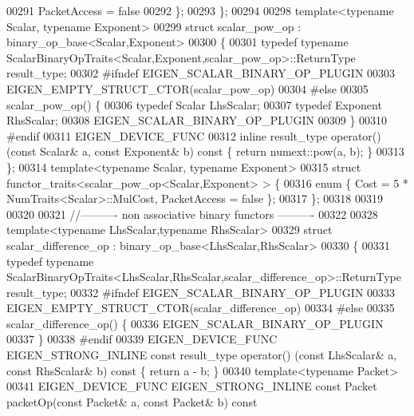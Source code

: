 \begin{DoxyCode}
00291     PacketAccess = \textcolor{keyword}{false}
00292   \};
00293 \};
00294 
00298 \textcolor{keyword}{template}<\textcolor{keyword}{typename} Scalar, \textcolor{keyword}{typename} Exponent>
00299 \textcolor{keyword}{struct }scalar\_pow\_op  : binary\_op\_base<Scalar,Exponent>
00300 \{
00301   \textcolor{keyword}{typedef} \textcolor{keyword}{typename} ScalarBinaryOpTraits<Scalar,Exponent,scalar\_pow\_op>::ReturnType result\_type;
00302 \textcolor{preprocessor}{#ifndef EIGEN\_SCALAR\_BINARY\_OP\_PLUGIN}
00303   EIGEN\_EMPTY\_STRUCT\_CTOR(scalar\_pow\_op)
00304 \textcolor{preprocessor}{#else}
00305   scalar\_pow\_op() \{
00306     \textcolor{keyword}{typedef} Scalar LhsScalar;
00307     \textcolor{keyword}{typedef} Exponent RhsScalar;
00308     EIGEN\_SCALAR\_BINARY\_OP\_PLUGIN
00309   \}
00310 \textcolor{preprocessor}{#endif}
00311   EIGEN\_DEVICE\_FUNC
00312   \textcolor{keyword}{inline} result\_type operator() (\textcolor{keyword}{const} Scalar& a, \textcolor{keyword}{const} Exponent& b)\textcolor{keyword}{ const }\{ \textcolor{keywordflow}{return} numext::pow(a, b); \}
00313 \};
00314 \textcolor{keyword}{template}<\textcolor{keyword}{typename} Scalar, \textcolor{keyword}{typename} Exponent>
00315 \textcolor{keyword}{struct }functor\_traits<scalar\_pow\_op<Scalar,Exponent> > \{
00316   \textcolor{keyword}{enum} \{ Cost = 5 * NumTraits<Scalar>::MulCost, PacketAccess = \textcolor{keyword}{false} \};
00317 \};
00318 
00319 
00320 
00321 \textcolor{comment}{//---------- non associative binary functors ----------}
00322 
00328 \textcolor{keyword}{template}<\textcolor{keyword}{typename} LhsScalar,\textcolor{keyword}{typename} RhsScalar>
00329 \textcolor{keyword}{struct }scalar\_difference\_op : binary\_op\_base<LhsScalar,RhsScalar>
00330 \{
00331   \textcolor{keyword}{typedef} \textcolor{keyword}{typename} ScalarBinaryOpTraits<LhsScalar,RhsScalar,scalar\_difference\_op>::ReturnType result\_type;
00332 \textcolor{preprocessor}{#ifndef EIGEN\_SCALAR\_BINARY\_OP\_PLUGIN}
00333   EIGEN\_EMPTY\_STRUCT\_CTOR(scalar\_difference\_op)
00334 \textcolor{preprocessor}{#else}
00335   scalar\_difference\_op() \{
00336     EIGEN\_SCALAR\_BINARY\_OP\_PLUGIN
00337   \}
00338 \textcolor{preprocessor}{#endif}
00339   EIGEN\_DEVICE\_FUNC EIGEN\_STRONG\_INLINE \textcolor{keyword}{const} result\_type operator() (\textcolor{keyword}{const} LhsScalar& a, \textcolor{keyword}{const} RhsScalar& 
      b)\textcolor{keyword}{ const }\{ \textcolor{keywordflow}{return} a - b; \}
00340   \textcolor{keyword}{template}<\textcolor{keyword}{typename} Packet>
00341   EIGEN\_DEVICE\_FUNC EIGEN\_STRONG\_INLINE \textcolor{keyword}{const} Packet packetOp(\textcolor{keyword}{const} Packet& a, \textcolor{keyword}{const} Packet& b)\textcolor{keyword}{ const}

\end{DoxyCode}
